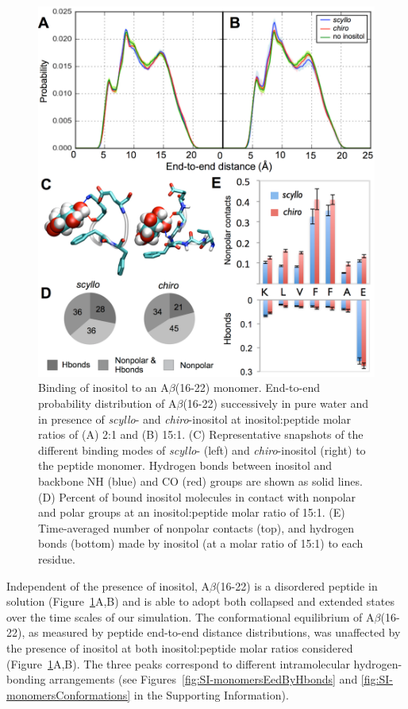 \begin{figure}
\includegraphics[width=14.6cm]{figures/results2/inos2_figures_monomers_revised.pdf}
\caption[Binding of inositol to an A$\beta$(16-22) monomer]{Binding of inositol to an A$\beta$(16-22) monomer.  End-to-end probability distribution of A$\beta$(16-22) successively in pure water and in presence of \emph{scyllo}- and \emph{chiro}-inositol at inositol:peptide molar ratios of (A) 2:1 and (B) 15:1.  (C) Representative snapshots of the different binding modes of \emph{scyllo}- (left) and \emph{chiro}-inositol (right)  to the peptide monomer. Hydrogen bonds between inositol and backbone NH (blue) and CO (red) groups are shown as solid lines. (D) Percent of bound inositol molecules in contact with nonpolar and polar groups at an inositol:peptide molar ratio of 15:1. (E) Time-averaged number of nonpolar contacts (top), and hydrogen bonds (bottom) made by inositol  (at a molar ratio of 15:1) to each residue.}
\label{fig:monomers}
\end{figure}

Independent of the presence of inositol, A$\beta$(16-22) is a disordered peptide in solution (Figure~\ref{fig:monomers}A,B) and is able to adopt both collapsed and extended states over the time scales of our simulation. The conformational equilibrium of A$\beta$(16-22), as measured by peptide end-to-end distance distributions, was unaffected by the presence of inositol at both inositol:peptide molar ratios considered (Figure~\ref{fig:monomers}A,B). The three peaks correspond to different intramolecular hydrogen-bonding arrangements (see Figures~\ref{fig:SI-monomersEedByHbonds} and \ref{fig:SI-monomersConformations} in the Supporting Information).

